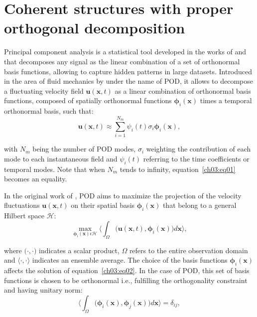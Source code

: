 \section{Coherent structures with proper orthogonal decomposition}\label{ch02:s3}

Principal component analysis is a statistical tool developed in the works of \citet{pearson1901liii} and \citet{hotelling1933analysis} that decomposes any signal as the linear combination of a set of orthonormal basis functions, allowing to capture hidden patterns in large datasets.
Introduced in the area of fluid mechanics by \citet{lumley1967structure} under the name of POD, it allows to decompose a fluctuating velocity field $\boldsymbol{u}(\boldsymbol{x}, t)$ as a linear combination of orthonormal basis functions, composed of spatially orthonormal functions $\boldsymbol{\phi}_i(\boldsymbol{x})$ times a temporal orthonormal basis, such that:
\begin{equation}
  \boldsymbol{u}(\boldsymbol{x}, t) \approx \sum_{i=1}^{N_m} \psi_i(t) \sigma_i \boldsymbol{\phi}_i(\boldsymbol{x}),
  \label{ch03:eq01}
\end{equation}

\noindent with $N_m$ being the number of POD modes, $\sigma_i$ weighting the contribution of each mode to each instantaneous field and $\psi_i(t)$ referring to the time coefficients or temporal modes.
Note that when $N_m$ tends to infinity, equation~\ref{ch03:eq01} becomes an equality.

In the original work of \citet{lumley1967structure}, POD aims to maximize the projection of the velocity fluctuations $\boldsymbol{u}(\boldsymbol{x}, t)$ on their spatial basis $\boldsymbol{\phi}_i(\boldsymbol{x})$ that belong to a general Hilbert space $\mathcal{H}$:
\begin{equation}
  \max_{\boldsymbol{\phi}_i(\boldsymbol{x})\epsilon\mathcal{H}}\biggl\langle\int_{\Omega} \bigl(\boldsymbol{u}(\boldsymbol{x}, t), \boldsymbol{\phi}_i(\boldsymbol{x})\bigl)d\boldsymbol{x}\biggl\rangle,
  \label{ch03:eq02}
\end{equation}

\noindent where $\bigl(\cdot,\cdot\bigl)$ indicates a scalar product, $\Omega$ refers to the entire observation domain and $\bigl\langle\cdot,\cdot\bigl\rangle$ indicates an ensemble average.
The choice of the basis functions $\boldsymbol{\phi}_i(\boldsymbol{x})$ affects the solution of equation~\ref{ch03:eq02}.
In the case of POD, this set of basis functions is chosen to be orthonormal i.e., fulfilling the orthogonality constraint and having unitary norm:
\begin{equation}
  \biggl\langle\int_{\Omega} \bigl(\boldsymbol{\phi}_i(\boldsymbol{x}), \boldsymbol{\phi}_j(\boldsymbol{x})\bigl)d\boldsymbol{x}\biggl\rangle=\delta_{ij},
  \label{ch03:eq03}
\end{equation}

